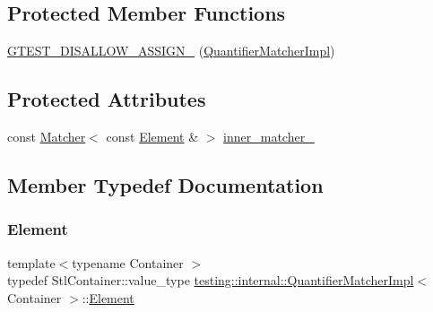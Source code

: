 \subsection*{Protected Member Functions}
\begin{DoxyCompactItemize}
\item 
\hyperlink{classtesting_1_1internal_1_1_quantifier_matcher_impl_ad57fcd1799e59217fe40c0144ff024f1}{G\+T\+E\+S\+T\+\_\+\+D\+I\+S\+A\+L\+L\+O\+W\+\_\+\+A\+S\+S\+I\+G\+N\+\_\+} (\hyperlink{classtesting_1_1internal_1_1_quantifier_matcher_impl}{Quantifier\+Matcher\+Impl})
\end{DoxyCompactItemize}
\subsection*{Protected Attributes}
\begin{DoxyCompactItemize}
\item 
const \hyperlink{classtesting_1_1_matcher}{Matcher}$<$ const \hyperlink{classtesting_1_1internal_1_1_quantifier_matcher_impl_a6f73e2e5fa853f8b5fdd33d6a1811f9e}{Element} \& $>$ \hyperlink{classtesting_1_1internal_1_1_quantifier_matcher_impl_af0ee2a4697f5cb8e937fd29dd75e2a30}{inner\+\_\+matcher\+\_\+}
\end{DoxyCompactItemize}


\subsection{Member Typedef Documentation}
\mbox{\label{classtesting_1_1internal_1_1_quantifier_matcher_impl_a6f73e2e5fa853f8b5fdd33d6a1811f9e}} 
\subsubsection{\texorpdfstring{Element}{Element}}
{\footnotesize\ttfamily template$<$typename Container $>$ \\
typedef Stl\+Container\+::value\+\_\+type \hyperlink{classtesting_1_1internal_1_1_quantifier_matcher_impl}{testing\+::internal\+::\+Quantifier\+Matcher\+Impl}$<$ Container $>$\+::\hyperlink{classtesting_1_1internal_1_1_quantifier_matcher_impl_a6f73e2e5fa853f8b5fdd33d6a1811f9e}{Element}}

